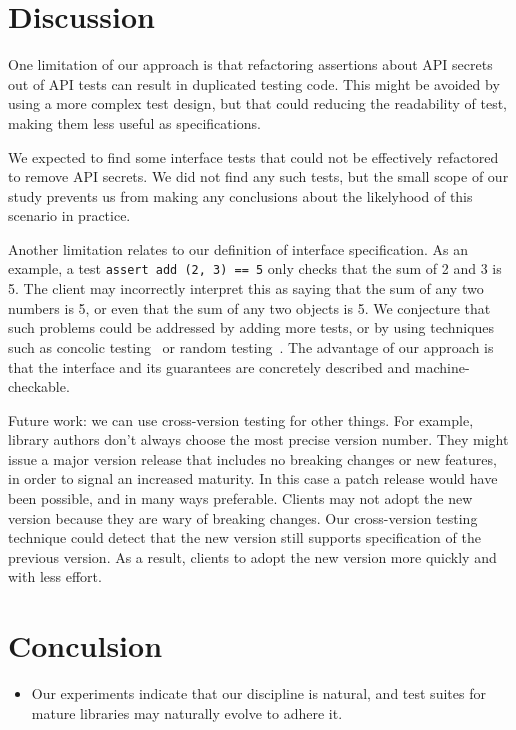 \section{Discussion}
One limitation of our approach is that refactoring assertions about
API secrets out of API tests can result in duplicated testing
code. This might be avoided by using a more complex test design, but
that could reducing the readability of test, making them less useful
as specifications.

We expected to find some interface tests that could not be effectively
refactored to remove API secrets. We did not find any such tests, but
the small scope of our study prevents us from making any conclusions
about the likelyhood of this scenario in practice. 

Another limitation relates to our definition of interface
specification. As an example, a test \texttt{assert add (2, 3) == 5}
only checks that the sum of 2 and 3 is 5. The client may incorrectly
interpret this as saying that the sum of any two numbers is 5, or
even that the sum of any two objects is 5. We conjecture that such
problems could be addressed by adding more tests, or by using
techniques such as concolic testing~\cite{sen05-cute} or random
testing~\cite{quickcheck}. The advantage of our approach is that the
interface and its guarantees are concretely described and
machine-checkable.

Future work: we can use cross-version testing for other things. For
example, library authors don't always choose the most precise version
number. They might issue a major version release that includes no
breaking changes or new features, in order to signal an increased
maturity. In this case a patch release would have been possible, and
in many ways preferable. Clients may not adopt the new version because
they are wary of breaking changes. Our cross-version testing technique
could detect that the new version still supports specification of the
previous version. As a result, clients to adopt the new version more
quickly and with less effort.


\section{Conculsion} 

\begin{itemize}
\item Our experiments indicate that our discipline is natural, and
  test suites for mature libraries may naturally evolve to adhere it.
\end{itemize}



